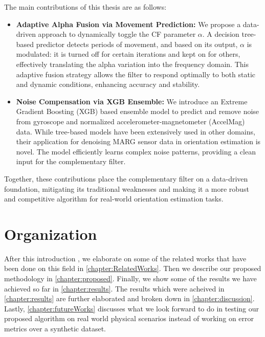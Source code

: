\documentclass{iutbscthesis}
\begin{document}
The main contributions of this thesis are as follows:  

\begin{itemize}
    \item \textbf{Adaptive Alpha Fusion via Movement Prediction:} We propose a data-driven approach to dynamically toggle the CF parameter $\alpha$. A decision tree-based predictor detects periods of movement, and based on its output, $\alpha$ is modulated: it is turned off for certain iterations and kept on for others, effectively translating the alpha variation into the frequency domain. This adaptive fusion strategy allows the filter to respond optimally to both static and dynamic conditions, enhancing accuracy and stability.  
    \item \textbf{Noise Compensation via XGB Ensemble:} We introduce an Extreme Gradient Boosting (XGB) based ensemble model to predict and remove noise from gyroscope and normalized accelerometer-magnetometer (AccelMag) data. While tree-based models have been extensively used in other domains, their application for denoising MARG sensor data in orientation estimation is novel. The model efficiently learns complex noise patterns, providing a clean input for the complementary filter.  

\end{itemize}  

Together, these contributions place the complementary filter on a data-driven foundation, mitigating its traditional weaknesses and making it a more robust and competitive algorithm for real-world orientation estimation tasks.



\section{Organization}

After this introduction , we elaborate on some of the related 
works 
that have been done on this field in \autoref{chapter:RelatedWorks}. 
Then we describe our proposed methodology in \autoref{chapter:proposed}. 
Finally, we show some of the results we have achieved so far 
in \autoref{chapter:results}. The results which were acheived in \autoref{chapter:results}
are further elaborated and broken down in \autoref{chapter:discussion}. Lastly,
\autoref{chapter:futureWorks} discusses what we look forward to do in testing our
proposed algorithm on real world physical scenarios instead of working on error
metrics over a synthetic dataset.
\end{document}
